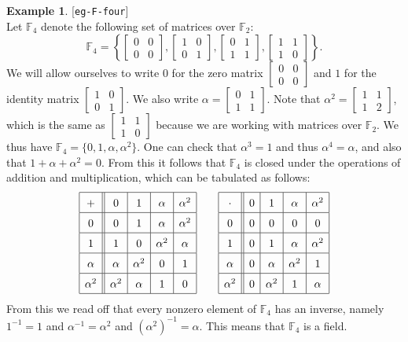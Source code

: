 \documentclass{amsart}
\newcommand{\lbl}[1]{\label{#1}\textup{[\texttt{#1}]}\ \\}
\newcommand{\lbl}{\label}
\newcommand{\F}         {{\mathbb{F}}}
\newcommand{\al}        {\alpha}
\newcommand{\bsm}       {\left[\begin{smallmatrix}}
\newcommand{\esm}       {\end{smallmatrix}\right]}
\renewcommand{\:}{\colon}
\theoremstyle{definition}
\newtheorem{example}[theorem]{Example}
\begin{document}
\begin{example}\lbl{eg-F-four}
 Let $\F_4$ denote the following set of matrices over $\F_2$:
 \[ \F_4 = \left\{ 
     \bsm 0&0\\ 0&0 \esm,
     \bsm 1&0\\ 0&1 \esm,
     \bsm 0&1\\ 1&1 \esm, 
     \bsm 1&1\\ 1&0 \esm
    \right\}. 
 \]
 We will allow ourselves to write $0$ for the zero matrix
 $\bsm 0&0\\ 0&0\esm$ and $1$ for the identity matrix
 $\bsm 1&0\\ 0&1\esm$.  We also write $\al=\bsm 0&1\\1&1\esm$.  Note
 that $\al^2=\bsm 1&1\\ 1&2\esm$, which is the same as
 $\bsm 1&1\\1&0\esm$ because we are working with matrices over
 $\F_2$.  We thus have $\F_4=\{0,1,\al,\al^2\}$.  One can check that
 $\al^3=1$ and thus $\al^4=\al$, and also that $1+\al+\al^2=0$.  From
 this it follows that $\F_4$ is closed under the operations of
 addition and multiplication, which can be tabulated as follows:
 \[ \renewcommand{\arraystretch}{1.5}
   \begin{array}{|c||c|c|c|c|}
    \hline
     + & 0 & 1 & \al & \al^2 \\ \hline
     0 & 0 & 1 & \al & \al^2 \\ \hline
     1 & 1 & 0 & \al^2 & \al \\ \hline
     \al & \al & \al^2 & 0 & 1 \\ \hline
     \al^2 & \al^2 & \al & 1 & 0 \\ \hline
   \end{array}
   \hspace{2em}
   \begin{array}{|c||c|c|c|c|}
    \hline
     \cdot & 0 & 1 & \al & \al^2 \\ \hline
     0 & 0 & 0 & 0 & 0 \\ \hline
     1 & 0 & 1 & \al & \al^2 \\ \hline
     \al & 0 & \al & \al^2 & 1 \\ \hline
     \al^2 & 0 & \al^2 & 1 & \al \\ \hline
   \end{array}
 \]
 From this we read off that every nonzero element of $\F_4$ has an
 inverse, namely $1^{-1}=1$ and $\al^{-1}=\al^2$ and
 $(\al^2)^{-1}=\al$.  This means that $\F_4$ is a field.
\end{example} 
\end{document}
